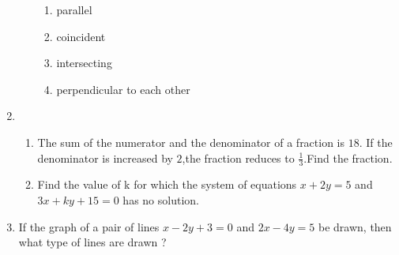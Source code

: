\documentclass{article}
\begin{document}
\begin{enumerate}
\begin{enumerate}[label=(\roman*)]
\begin{enumerate}[label=(\Alph*)]
             \item parallel
             \item coincident
             \item intersecting
             \item perpendicular to each other
\end{enumerate}
\end{enumerate}
\item
\begin{enumerate}
\item The sum of the numerator and the denominator of a fraction is $18$. If the denominator is increased by $2$,the fraction reduces to $\frac{1}{3}$.Find the fraction.
\item Find the value of k for which the system of equations $x+2y=5$ and $3x+ky+15=0$ has no solution.
\end{enumerate}
\item If the graph of a pair of lines $x-2y+3=0$ and $2x-4y=5$ be drawn, then what type of lines are drawn ?
\end{enumerate}
\end{document}
